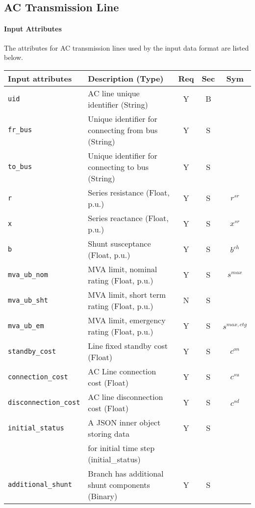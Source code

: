 \documentclass{article}
\begin{document}
\subsection{AC Transmission Line}
\label{nom:line}
\paragraph{Input Attributes}
The attributes for AC transmission lines used by the input data format are listed below.

\begin{center}
\small
\begin{tabular}{ l | l | c | c | c | }
Input attributes & Description (Type)& Req & Sec & Sym\\
\hline
  {\tt uid} & AC line unique identifier (String)& Y & B &  \\
  {\tt fr\_bus} & Unique identifier for connecting from bus (String)& Y & S & \\
  {\tt to\_bus} & Unique identifier for connecting to bus (String)& Y & S & \\
  {\tt r} & Series resistance (Float, p.u.)& Y & S & $r^{sr}$\\
  {\tt x} & Series reactance  (Float, p.u.)& Y & S & $x^{sr}$\\
  {\tt b} & Shunt susceptance (Float, p.u.)& Y & S & $b^{ch}$\\
  {\tt mva\_ub\_nom} & MVA limit, nominal rating (Float, p.u.)& Y & S & $s^{max}$\\
  {\tt mva\_ub\_sht} & MVA limit, short term rating (Float, p.u.)& N & S & \\
  {\tt mva\_ub\_em} & MVA limit, emergency rating (Float, p.u.)& Y & S & $s^{max,ctg}$\\
  {\tt standby\_cost} & Line fixed standby cost (Float) & Y & S & $c^{on}$\\
  {\tt connection\_cost} &  AC Line connection cost (Float) & Y & S & $c^{su}$\\
  {\tt disconnection\_cost} & AC line disconnection cost (Float) & Y & S & $c^{sd}$\\
  {\tt initial\_status} & A JSON inner object storing data  & Y & S &  \\
       & for initial time step (initial\_status) &  &  &  \\
  {\tt additional\_shunt} & Branch has additional shunt components (Binary)& Y & S & \\

\end{tabular}
\end{center}
\end{document}
